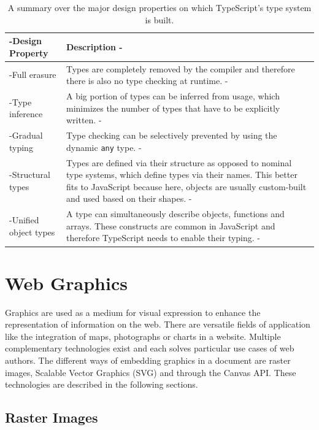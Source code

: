 \begin{table}[tp]
\tablestretch
{}
\centering
\begin{tabularx}{\linewidth}{>{\kern-\tabcolsep}lX<{\kern-\tabcolsep}}
\toprule
Design Property & Description \\
\midrule
Full erasure         & Types are completely removed by the compiler and therefore there is also no type checking at runtime. \\
Type inference       & A big portion of types can be inferred from usage, which minimizes the number of types that have to be explicitly written. \\
Gradual typing       & Type checking can be selectively prevented by using the dynamic \lstinline{any} type. \\
Structural types     & Types are defined via their structure as opposed to nominal type systems, which define types via their names. This better fits to JavaScript because here, objects are usually custom-built and used based on their shapes. \\
Unified object types & A type can simultaneously describe objects, functions and arrays. These constructs are common in JavaScript and therefore TypeScript needs to enable their typing. \\
\bottomrule
\end{tabularx}
\caption[TypeScript Type System Design Properties]{
  A summary over the major design properties on which TypeScript's type system is built.
}
\label{tab:TSTypeSystemDesignProperties}
\end{table}

\section{Web Graphics}
\label{sec:WebGraphics}

Graphics are used as a medium for visual expression to enhance the representation of information on the web. 
There are versatile fields of application like the integration of maps, photographs or charts in a website. 
Multiple complementary technologies exist and each solves particular use cases of web authors. 
The different ways of embedding graphics in a document are raster images, Scalable Vector Graphics (SVG) and through the Canvas API. 
These technologies are described in the following sections.

\subsection{Raster Images}
\label{sec:RasterImages}

